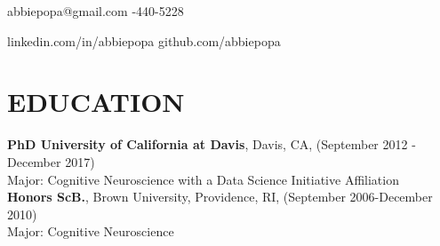 \documentclass[line,margin,10pt]{res}
\begin{document}
 
\begin{resume}
\hoffset\centerline 
{abbiepopa@gmail.com \quad \quad \quad \quad  \quad \quad \quad \quad \quad \quad \quad \quad \quad \quad \quad \quad \quad \quad \quad \quad \quad\quad \quad \quad \quad \quad \quad \quad \quad \quad \quad \quad  \quad \quad {}-440-5228}
\hoffset\centerline 
{\hspace{0.05cm} linkedin.com/in/abbiepopa \quad \quad \quad \quad \quad \quad \quad \quad \quad \quad \quad\quad \quad \quad \quad \quad \quad \quad \quad \quad \quad \quad  \quad \quad \quad  \quad \quad \quad   \quad github.com/abbiepopa}
 
\section{EDUCATION} 
\textbf{PhD University of California at Davis}, Davis, CA, (September 2012 - December 2017)\\
Major: Cognitive Neuroscience with a Data Science Initiative Affiliation\\
\textbf{Honors ScB.}, Brown University, Providence, RI, (September 2006-December 2010)\\
                Major: Cognitive Neuroscience
								


\end{resume}
\end{document}
